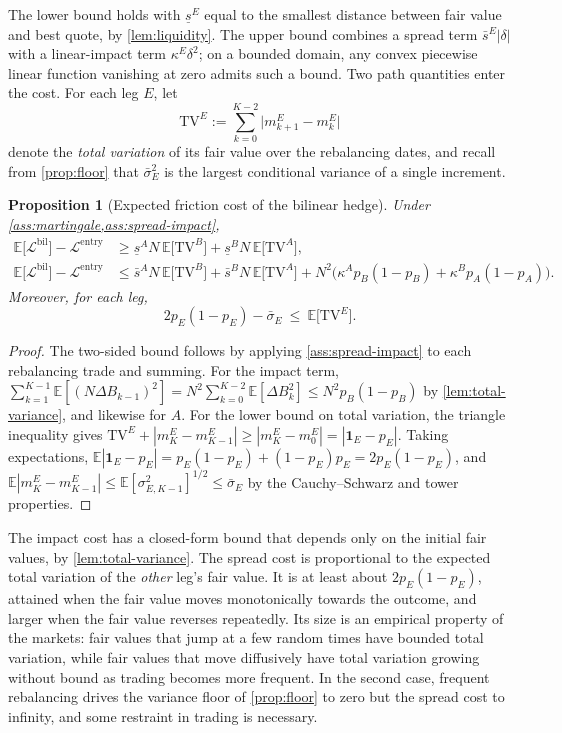 \documentclass[11pt,a4paper]{article}
\theoremstyle{plain}
\newtheorem{proposition}[theorem]{Proposition}
\theoremstyle{definition}
\theoremstyle{remark}
\newcommand{\E}{\mathbb{E}}
\newcommand{\1}{\mathbf{1}}
\begin{document}
The lower bound holds with $\underline s^E$ equal to the smallest distance between fair value and best quote, by \cref{lem:liquidity}. The upper bound combines a spread term $\bar s^E|\delta|$ with a linear-impact term $\kappa^E\delta^2$; on a bounded domain, any convex piecewise linear function vanishing at zero admits such a bound. Two path quantities enter the cost. For each leg $E$, let
\[
\mathrm{TV}^E := \sum_{k=0}^{K-2}\bigl|m^E_{k+1}-m^E_k\bigr|
\]
denote the \emph{total variation} of its fair value over the rebalancing dates, and recall from \cref{prop:floor} that $\bar\sigma^2_E$ is the largest conditional variance of a single increment.

\begin{proposition}[Expected friction cost of the bilinear hedge]
\label{prop:friction-bilinear}
Under \cref{ass:martingale,ass:spread-impact},
\begin{align*}
\E\bigl[\mathcal{L}^{\mathrm{bil}}\bigr] - \mathcal{L}^{\mathrm{entry}} &\geq \underline s^A N\,\E\bigl[\mathrm{TV}^B\bigr] + \underline s^B N\,\E\bigl[\mathrm{TV}^A\bigr],\\
\E\bigl[\mathcal{L}^{\mathrm{bil}}\bigr] - \mathcal{L}^{\mathrm{entry}} &\leq \bar s^A N\,\E\bigl[\mathrm{TV}^B\bigr] + \bar s^B N\,\E\bigl[\mathrm{TV}^A\bigr] + N^2\bigl(\kappa^A p_B(1-p_B) + \kappa^B p_A(1-p_A)\bigr).
\end{align*}
Moreover, for each leg,
\[
2p_E(1-p_E) - \bar\sigma_E\ \leq\ \E\bigl[\mathrm{TV}^E\bigr].
\]
\end{proposition}

\begin{proof}
The two-sided bound follows by applying \cref{ass:spread-impact} to each rebalancing trade and summing. For the impact term, $\sum_{k=1}^{K-1}\E[(N\Delta B_{k-1})^2] = N^2\sum_{k=0}^{K-2}\E[\Delta B_k^2]\leq N^2 p_B(1-p_B)$ by \cref{lem:total-variance}, and likewise for $A$. For the lower bound on total variation, the triangle inequality gives $\mathrm{TV}^E + |m^E_K - m^E_{K-1}|\geq|m^E_K - m^E_0| = |\1_E - p_E|$. Taking expectations, $\E|\1_E - p_E| = p_E(1-p_E) + (1-p_E)p_E = 2p_E(1-p_E)$, and $\E|m^E_K-m^E_{K-1}|\leq\E[\sigma^2_{E,K-1}]^{1/2}\leq\bar\sigma_E$ by the Cauchy--Schwarz and tower properties.
\end{proof}

The impact cost has a closed-form bound that depends only on the initial fair values, by \cref{lem:total-variance}. The spread cost is proportional to the expected total variation of the \emph{other} leg's fair value. It is at least about $2p_E(1-p_E)$, attained when the fair value moves monotonically towards the outcome, and larger when the fair value reverses repeatedly. Its size is an empirical property of the markets: fair values that jump at a few random times have bounded total variation, while fair values that move diffusively have total variation growing without bound as trading becomes more frequent. In the second case, frequent rebalancing drives the variance floor of \cref{prop:floor} to zero but the spread cost to infinity, and some restraint in trading is necessary.
\end{document}
